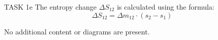 TASK 1e  
The entropy change \( \Delta S_{12} \) is calculated using the formula:  
\[
\Delta S_{12} = \Delta m_{12} \cdot (s_2 - s_1)
\]  

No additional content or diagrams are present.